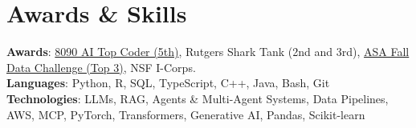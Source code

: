 \documentclass[letterpaper,11pt]{article}
\begin{document}
\section{Awards \& Skills}
 \begin{itemize}[leftmargin=0.15in, label={}]
    \small{\item{
     \textbf{Awards}{: \href{https://github.com/AkeBoss-tech/top-coder-challenge}{8090 AI Top Coder (5th)}, Rutgers Shark Tank (2nd and 3rd), \href{https://acashmoney.biz/portfolio/asa-fall-data/}{ASA Fall Data Challenge (Top 3)}, NSF I-Corps.} \\
     \textbf{Languages}{: Python, R, SQL, TypeScript, C++, Java, Bash, Git} \\
     \textbf{Technologies}{: LLMs, RAG, Agents \& Multi-Agent Systems, Data Pipelines, AWS, MCP, PyTorch, Transformers, Generative AI, Pandas, Scikit-learn}
    }}
 \end{itemize}
\end{document}
